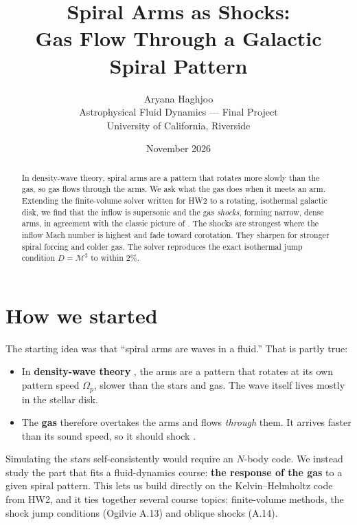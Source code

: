 \documentclass[11pt]{article}
\title{\textbf{Spiral Arms as Shocks:}\\ Gas Flow Through a Galactic Spiral Pattern}
\author{Aryana Haghjoo\\[2pt] \small Astrophysical Fluid Dynamics --- Final Project\\ \small University of California, Riverside}
\date{November 2026}
\begin{document}
\maketitle

\begin{abstract}
In density-wave theory, spiral arms are a pattern that rotates more slowly than the gas, so gas flows through the arms. We ask what the gas does when it meets an arm. Extending the finite-volume solver written for HW2 to a rotating, isothermal galactic disk, we find that the inflow is supersonic and the gas \emph{shocks}, forming narrow, dense arms, in agreement with the classic picture of \citet{roberts69}. The shocks are strongest where the inflow Mach number is highest and fade toward corotation. They sharpen for stronger spiral forcing and colder gas. The solver reproduces the exact isothermal jump condition $D=\mathcal{M}^2$ to within 2\%.
\end{abstract}

\section{How we started}
The starting idea was that ``spiral arms are waves in a fluid.'' That is partly true:
\begin{itemize}[nosep]
\item In \textbf{density-wave theory} \citep{linshu64}, the arms are a pattern that rotates at its own pattern speed $\Omega_p$, slower than the stars and gas. The wave itself lives mostly in the stellar disk.
\item The \textbf{gas} therefore overtakes the arms and flows \emph{through} them. It arrives faster than its sound speed, so it should shock \citep{roberts69}.
\end{itemize}
Simulating the stars self-consistently would require an $N$-body code. We instead study the part that fits a fluid-dynamics course: \textbf{the response of the gas} to a given spiral pattern. This lets us build directly on the Kelvin--Helmholtz code from HW2, and it ties together several course topics: finite-volume methods, the shock jump conditions (Ogilvie A.13) and oblique shocks (A.14).

\end{document}
